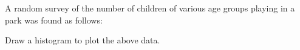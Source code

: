 A random survey of the number of children
of various age groups playing in a park was
found as follows:
\begin{table}[!ht]
\centering

\label{table:Q44}	
\end{table}
Draw a histogram to plot the above data.
